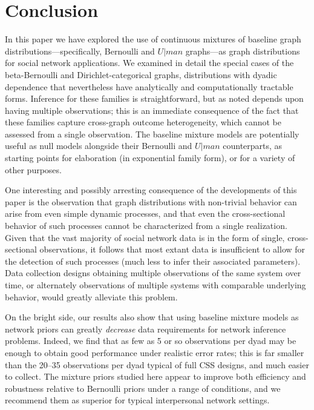 \documentclass[11pt]{article}
\begin{document}
\section{Conclusion}

In this paper we have explored the use of continuous mixtures of baseline graph distributions---specifically, Bernoulli and $U|man$ graphs---as graph distributions for social network applications.  We examined in detail the special cases of the beta-Bernoulli and Dirichlet-categorical graphs, distributions with dyadic dependence that nevertheless have analytically and computationally tractable forms.  Inference for these families is straightforward, but as noted depends upon having multiple observations; this is an immediate consequence of the fact that these families capture cross-graph outcome heterogeneity, which cannot be assessed from a single observation.  The baseline mixture models are potentially useful as null models alongside their Bernoulli and $U|man$ counterparts, as starting points for elaboration (in exponential family form), or for a variety of other purposes.

One interesting and possibly arresting consequence of the developments of this paper is the observation that graph distributions with non-trivial behavior can arise from even simple dynamic processes, and that even the cross-sectional behavior of such processes cannot be characterized from a single realization.  Given that the vast majority of social network data is in the form of single, cross-sectional observations, it follows that most extant data is insufficient to allow for the detection of such processes (much less to infer their associated parameters).  Data collection designs obtaining multiple observations of the same system over time, or alternately observations of multiple systems with comparable underlying behavior, would greatly alleviate this problem.

On the bright side, our results also show that using baseline mixture models as network priors can greatly \emph{decrease} data requirements for network inference problems.  Indeed, we find that as few as 5 or so observations per dyad may be enough to obtain good performance under realistic error rates; this is far smaller than the 20--35 observations per dyad typical of full CSS designs, and much easier to collect.  The mixture priors studied here appear to improve both efficiency and robustness relative to Bernoulli priors under a range of conditions, and we recommend them as superior for typical interpersonal network settings.
\end{document}
